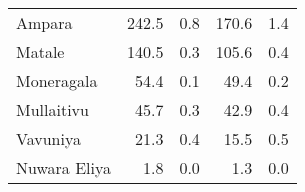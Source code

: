 \begin{tabular}{lrrrr}
Ampara       &          242.5 &                 0.8 &          170.6 &                 1.4 \\
Matale       &          140.5 &                 0.3 &          105.6 &                 0.4 \\
Moneragala   &           54.4 &                 0.1 &           49.4 &                 0.2 \\
Mullaitivu   &           45.7 &                 0.3 &           42.9 &                 0.4 \\
Vavuniya     &           21.3 &                 0.4 &           15.5 &                 0.5 \\
Nuwara Eliya &            1.8 &                 0.0 &            1.3 &                 0.0 \\
\bottomrule
\end{tabular}

